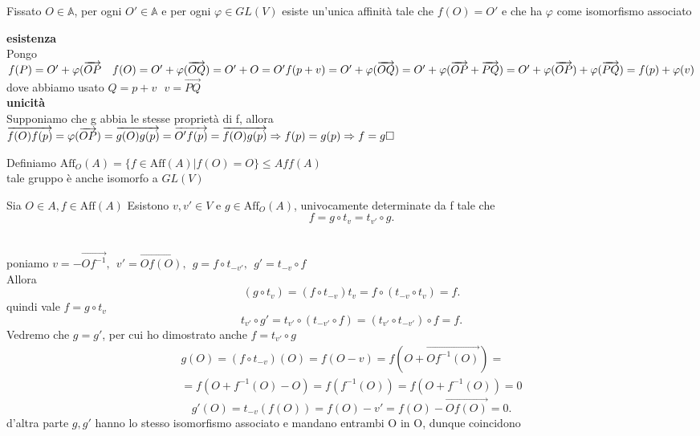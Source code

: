 \documentclass[12px]{article}
\begin{document}
\begin{lemm}
	Fissato $O\in \mathbb{A} $, per ogni $O'\in \mathbb{A} $ e per ogni $ \varphi\in GL(V) $ esiste un'unica affinità tale che $f(O) = O'$ e che ha $ \varphi$ come isomorfismo associato
\end{lemm}
\begin{dimo}
	\textbf{esistenza}\\
	Pongo $f(P) = O' + \varphi(\overrightarrow{OP} \ \ \ f(O) = O' + \varphi(\overrightarrow{OQ}) = O' + O = O'\\
	f(p + v) = O' + \varphi(\overrightarrow{OQ}) = O' + \varphi(\overrightarrow{OP} + \overrightarrow{PQ}) = O' + \varphi(\overrightarrow{OP}) + \varphi(\overrightarrow{PQ}) = f(p) + \varphi(v)$\\
	dove abbiamo usato $Q = p + v \ \ \ v = \overrightarrow{PQ}$\\
	\textbf{unicità}\\
	Supponiamo che g abbia le stesse proprietà di f, allora \\
	$\overrightarrow{f(O)f(p)} = \varphi(\overrightarrow{OP}) = \overrightarrow{g(O)g(p)} = \overrightarrow{O'f(p)} = \overrightarrow{f(O)g(p)} \Rightarrow f(p) = g(p)\\ \Rightarrow  f = g \hfill\square$
\end{dimo}
\begin{defi}
	Definiamo 
	$\text{Aff}_O(A) = \{f\in \text{Aff}(A) | f(O) = O\} \leq Aff(A)$\\
	tale gruppo è anche isomorfo a $GL(V)$
\end{defi}
\begin{lemm}
	Sia $O\in A, f \in\text{Aff}(A)$ Esistono $v,v'\in V$ e $g\in\text{Aff}_O(A)$, univocamente determinate da f tale che
	\[
		f = g \circ t_v = t_{v'}\circ g
	.\] 
\end{lemm}
\begin{dimo}\ \\
	poniamo $v = -\overrightarrow{Of^{-1}}, \ \ v' = \overrightarrow{Of(O)}, \ \  g = f\circ t_{-v'}, \ \  g' = t_{-v}\circ f$ \\
	Allora
	\[
		(g \circ t_v) = (f\circ t_{-v})t_v = f\circ(t_{-v}\circ t_v) = f
	.\] 
	quindi vale $f = g\circ t_v$
	\[
		t_{v'}\circ g' = t_{v'}\circ (t_{-v'}\circ f) = (t_{v'}\circ t_{-v'})\circ f = f
	.\] 
	Vedremo che $g = g'$, per cui ho dimostrato anche $f = t_{v'}\circ g$ \\
	\begin{gather*}
		g(O) = (f\circ t_{-v})(O) = f(O-v) = f(O + \overrightarrow{Of^{-1}(O)}) = \\ = f(O + f^{-1}(O) - O) = f(f^{-1}(O)) = f(O + f^{-1}(O)) = 0
	\end{gather*}
	\[
		g'(O) = t_{-v}(f(O)) = f(O) - v' = f(O) - \overrightarrow{Of(O)} = 0
	.\]
	d'altra parte $g, g'$ hanno lo stesso isomorfismo associato e mandano entrambi O in O, dunque coincidono
\end{dimo}
\end{document}
